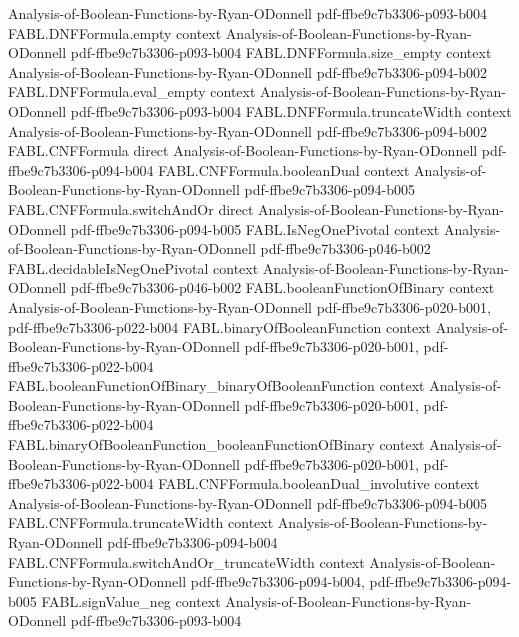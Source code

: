 \begin{theorem}
  {Analysis-of-Boolean-Functions-by-Ryan-ODonnell}
  {pdf-ffbe9c7b3306-p093-b004}
\proofstep
  {FABL.DNFFormula.empty}
  {context}
  {Analysis-of-Boolean-Functions-by-Ryan-ODonnell}
  {pdf-ffbe9c7b3306-p093-b004}
\proofstep
  {FABL.DNFFormula.size_empty}
  {context}
  {Analysis-of-Boolean-Functions-by-Ryan-ODonnell}
  {pdf-ffbe9c7b3306-p094-b002}
\proofstep
  {FABL.DNFFormula.eval_empty}
  {context}
  {Analysis-of-Boolean-Functions-by-Ryan-ODonnell}
  {pdf-ffbe9c7b3306-p093-b004}
\proofstep
  {FABL.DNFFormula.truncateWidth}
  {context}
  {Analysis-of-Boolean-Functions-by-Ryan-ODonnell}
  {pdf-ffbe9c7b3306-p094-b002}
\proofstep
  {FABL.CNFFormula}
  {direct}
  {Analysis-of-Boolean-Functions-by-Ryan-ODonnell}
  {pdf-ffbe9c7b3306-p094-b004}
\proofstep
  {FABL.CNFFormula.booleanDual}
  {context}
  {Analysis-of-Boolean-Functions-by-Ryan-ODonnell}
  {pdf-ffbe9c7b3306-p094-b005}
\proofstep
  {FABL.CNFFormula.switchAndOr}
  {direct}
  {Analysis-of-Boolean-Functions-by-Ryan-ODonnell}
  {pdf-ffbe9c7b3306-p094-b005}
\proofstep
  {FABL.IsNegOnePivotal}
  {context}
  {Analysis-of-Boolean-Functions-by-Ryan-ODonnell}
  {pdf-ffbe9c7b3306-p046-b002}
\proofstep
  {FABL.decidableIsNegOnePivotal}
  {context}
  {Analysis-of-Boolean-Functions-by-Ryan-ODonnell}
  {pdf-ffbe9c7b3306-p046-b002}
\proofstep
  {FABL.booleanFunctionOfBinary}
  {context}
  {Analysis-of-Boolean-Functions-by-Ryan-ODonnell}
  {pdf-ffbe9c7b3306-p020-b001,
    pdf-ffbe9c7b3306-p022-b004}
\proofstep
  {FABL.binaryOfBooleanFunction}
  {context}
  {Analysis-of-Boolean-Functions-by-Ryan-ODonnell}
  {pdf-ffbe9c7b3306-p020-b001,
    pdf-ffbe9c7b3306-p022-b004}
\proofstep
  {FABL.booleanFunctionOfBinary_binaryOfBooleanFunction}
  {context}
  {Analysis-of-Boolean-Functions-by-Ryan-ODonnell}
  {pdf-ffbe9c7b3306-p020-b001,
    pdf-ffbe9c7b3306-p022-b004}
\proofstep
  {FABL.binaryOfBooleanFunction_booleanFunctionOfBinary}
  {context}
  {Analysis-of-Boolean-Functions-by-Ryan-ODonnell}
  {pdf-ffbe9c7b3306-p020-b001,
    pdf-ffbe9c7b3306-p022-b004}
\proofstep
  {FABL.CNFFormula.booleanDual_involutive}
  {context}
  {Analysis-of-Boolean-Functions-by-Ryan-ODonnell}
  {pdf-ffbe9c7b3306-p094-b005}
\proofstep
  {FABL.CNFFormula.truncateWidth}
  {context}
  {Analysis-of-Boolean-Functions-by-Ryan-ODonnell}
  {pdf-ffbe9c7b3306-p094-b004}
\proofstep
  {FABL.CNFFormula.switchAndOr_truncateWidth}
  {context}
  {Analysis-of-Boolean-Functions-by-Ryan-ODonnell}
  {pdf-ffbe9c7b3306-p094-b004,
    pdf-ffbe9c7b3306-p094-b005}
\proofstep
  {FABL.signValue_neg}
  {context}
  {Analysis-of-Boolean-Functions-by-Ryan-ODonnell}
  {pdf-ffbe9c7b3306-p093-b004}

\end{theorem}
